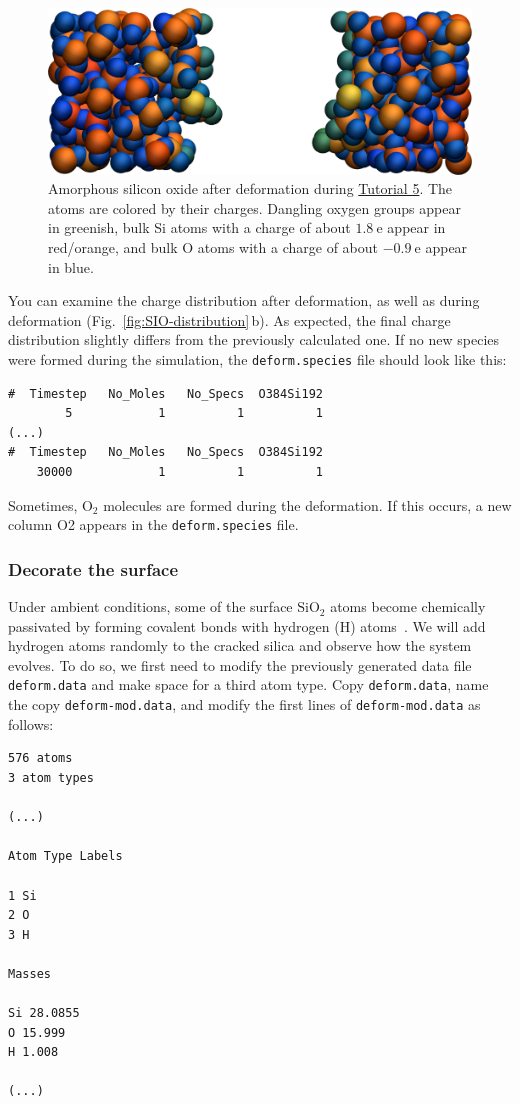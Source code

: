 \documentclass[9pt,tutorial]{livecoms}
\newcommand{\lmpcmd}[1]{\hspace{0pt}\colorbox{listing}{\textcolor{command}{\small{#1}}}\hspace{0pt}} %
\newcommand{\flecmd}[1]{\textcolor{command}{\texttt{#1}}} %
\begin{document}
\begin{figure}
\includegraphics[width=\linewidth]{SIO-deformed}
\caption{Amorphous silicon oxide after deformation during
\hyperref[reactive-silicon-dioxide-label]{Tutorial 5}.  The atoms are colored by their
charges.  Dangling oxygen groups appear in greenish, bulk Si atoms with a charge of
about $1.8~\text{e}$  appear in red/orange, and bulk O atoms with a charge of
about $-0.9 ~ \text{e}$ appear in blue.}
\label{fig:SIO-deformed}
\end{figure}

You can examine the charge distribution after deformation, as well as during
deformation (Fig.~\ref{fig:SIO-distribution}\,b).  As expected, the final
charge distribution slightly differs from the previously calculated one.  If
no new species were formed during the simulation, the \flecmd{deform.species} file
should look like this:
\begin{lstlisting}
#  Timestep   No_Moles   No_Specs  O384Si192
        5            1          1          1
(...)
#  Timestep   No_Moles   No_Specs  O384Si192
    30000            1          1          1
\end{lstlisting}
Sometimes, $\text{O}_2$ molecules are formed during the deformation.  If this occurs,
a new column \lmpcmd{O2} appears in the \flecmd{deform.species} file.

\subsubsection{Decorate the surface}

Under ambient conditions, some of the surface $\text{SiO}_2$ atoms become chemically
passivated by forming covalent bonds with hydrogen (H) atoms~\cite{sulpizi2012silica}.
We will add hydrogen atoms randomly to the cracked silica and observe how the
system evolves.  To do so, we first need to modify the previously generated data
file \flecmd{deform.data} and make space for a third atom type.
Copy \flecmd{deform.data}, name the copy \flecmd{deform-mod.data}, and modify the
first lines of \flecmd{deform-mod.data} as follows:
\begin{lstlisting}
576 atoms
3 atom types

(...)

Atom Type Labels

1 Si
2 O
3 H

Masses

Si 28.0855
O 15.999
H 1.008

(...)
\end{lstlisting}
\end{document}
